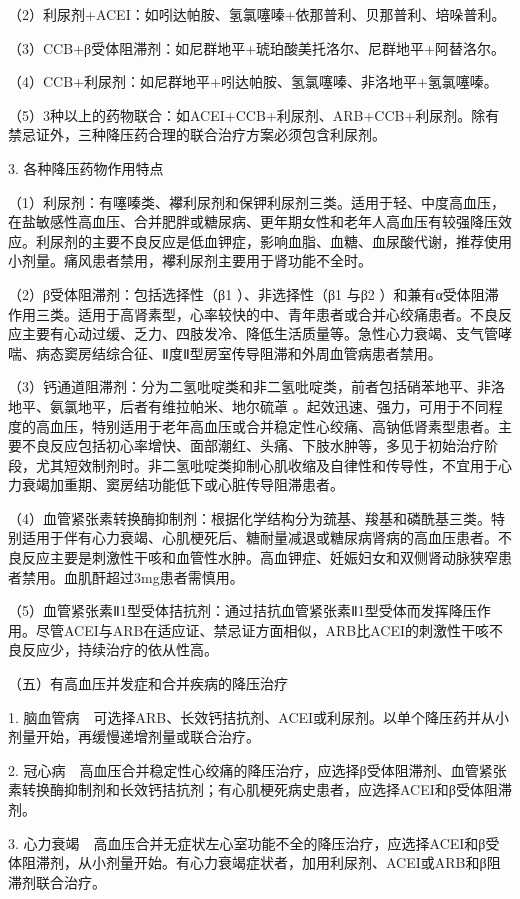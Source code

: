 （2）利尿剂+ACEI：如吲达帕胺、氢氯噻嗪+依那普利、贝那普利、培哚普利。

（3）CCB+β受体阻滞剂：如尼群地平+琥珀酸美托洛尔、尼群地平+阿替洛尔。

（4）CCB+利尿剂：如尼群地平+吲达帕胺、氢氯噻嗪、非洛地平+氢氯噻嗪。

（5）3种以上的药物联合：如ACEI+CCB+利尿剂、ARB+CCB+利尿剂。除有禁忌证外，三种降压药合理的联合治疗方案必须包含利尿剂。

3. 各种降压药物作用特点

（1）利尿剂：有噻嗪类、襻利尿剂和保钾利尿剂三类。适用于轻、中度高血压，在盐敏感性高血压、合并肥胖或糖尿病、更年期女性和老年人高血压有较强降压效应。利尿剂的主要不良反应是低血钾症，影响血脂、血糖、血尿酸代谢，推荐使用小剂量。痛风患者禁用，襻利尿剂主要用于肾功能不全时。

（2）β受体阻滞剂：包括选择性（β{1} ）、非选择性（β{1} 与β{2}
）和兼有α受体阻滞作用三类。适用于高肾素型，心率较快的中、青年患者或合并心绞痛患者。不良反应主要有心动过缓、乏力、四肢发冷、降低生活质量等。急性心力衰竭、支气管哮喘、病态窦房结综合征、Ⅱ度Ⅱ型房室传导阻滞和外周血管病患者禁用。

（3）钙通道阻滞剂：分为二氢吡啶类和非二氢吡啶类，前者包括硝苯地平、非洛地平、氨氯地平，后者有维拉帕米、地尔硫䓬
。起效迅速、强力，可用于不同程度的高血压，特别适用于老年高血压或合并稳定性心绞痛、高钠低肾素型患者。主要不良反应包括初心率增快、面部潮红、头痛、下肢水肿等，多见于初始治疗阶段，尤其短效制剂时。非二氢吡啶类抑制心肌收缩及自律性和传导性，不宜用于心力衰竭加重期、窦房结功能低下或心脏传导阻滞患者。

（4）血管紧张素转换酶抑制剂：根据化学结构分为巯基、羧基和磷酰基三类。特别适用于伴有心力衰竭、心肌梗死后、糖耐量减退或糖尿病肾病的高血压患者。不良反应主要是刺激性干咳和血管性水肿。高血钾症、妊娠妇女和双侧肾动脉狭窄患者禁用。血肌酐超过3mg患者需慎用。

（5）血管紧张素Ⅱ1型受体拮抗剂：通过拮抗血管紧张素Ⅱ1型受体而发挥降压作用。尽管ACEI与ARB在适应证、禁忌证方面相似，ARB比ACEI的刺激性干咳不良反应少，持续治疗的依从性高。

{（五）有高血压并发症和合并疾病的降压治疗}

1.
脑血管病　可选择ARB、长效钙拮抗剂、ACEI或利尿剂。以单个降压药并从小剂量开始，再缓慢递增剂量或联合治疗。

2.
冠心病　高血压合并稳定性心绞痛的降压治疗，应选择β受体阻滞剂、血管紧张素转换酶抑制剂和长效钙拮抗剂；有心肌梗死病史患者，应选择ACEI和β受体阻滞剂。

3.
心力衰竭　高血压合并无症状左心室功能不全的降压治疗，应选择ACEI和β受体阻滞剂，从小剂量开始。有心力衰竭症状者，加用利尿剂、ACEI或ARB和β阻滞剂联合治疗。

